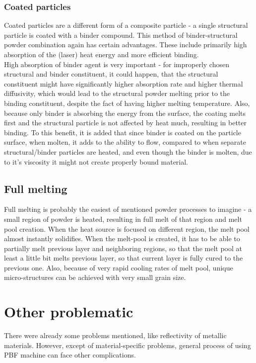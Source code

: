 \documentclass[a4paper, twoside, 11pt]{report}
\begin{document}
\subsubsection{Coated particles}
Coated particles are a different form of a composite particle - a single structural particle is coated with a binder compound. This method of binder-structural powder combination again has certain advantages. These include primarily high absorption of the (laser) heat energy and more efficient binding.\\
	High absorption of binder agent is very important - for improperly chosen structural and binder constituent, it could happen, that the structural constituent might have significantly higher absorption rate and higher thermal diffusivity, which would lead to the structural powder melting prior to the binding constituent, despite the fact of having higher melting temperature. Also, because only binder is absorbing the energy from the surface, the coating melts first and the structural particle is not affected by heat much, resulting in better binding. To this benefit, it is added that since binder is coated on the particle surface, when molten, it adds to the ability to flow, compared to when separate structural/binder particles are heated, and even though the binder is molten, due to it's viscosity it might not create properly bound material.

\subsection{Full melting}
Full melting is probably the easiest of mentioned powder processes to imagine - a small region of powder is heated, resulting in full melt of that region and melt pool creation. When the heat source is focused on different region, the melt pool almost instantly solidifies. When the melt-pool is created, it has to be able to partially melt previous layer and neighboring regions, so that the melt pool at least a little bit melts previous layer, so that current layer is fully cured to the previous one. Also, because of very rapid cooling rates of melt pool, unique micro-structures can be achieved with very small grain size.

\section{Other problematic}
There were already some problems mentioned, like reflectivity of metallic materials. However, except of material-specific problems, general process of using PBF machine can face other complications.
\end{document}
